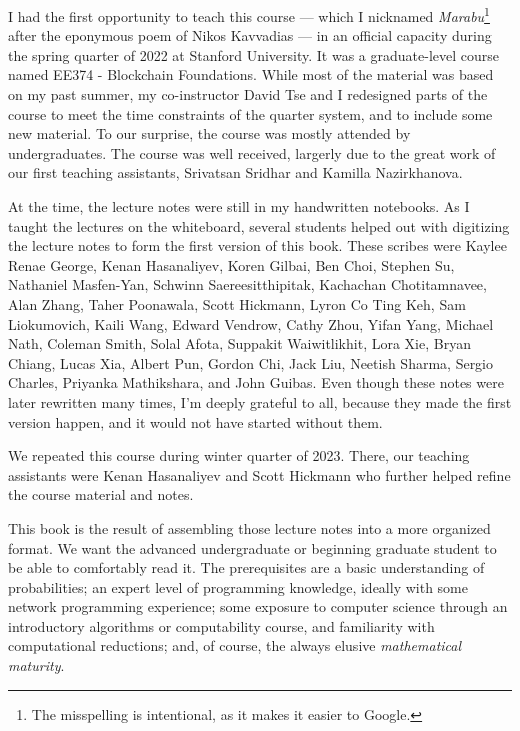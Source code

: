 % 
I had the first opportunity to teach this course --- which I nicknamed
\emph{Marabu}\footnote{The misspelling is intentional, as it makes it easier to Google.}
after the eponymous poem of Nikos Kavvadias --- in an official capacity during the
spring quarter of 2022 at Stanford University. It was a graduate-level course
named EE374 - Blockchain Foundations. While most of the material was
based on my past summer, my co-instructor David Tse and I redesigned
parts of the course to meet the time constraints of the quarter system,
and to include some new material. To our surprise, the course was mostly
attended by undergraduates.
The course was well received,
largerly due to the great work of our first teaching assistants,
Srivatsan Sridhar and Kamilla Nazirkhanova.

At the time, the lecture notes were still
in my handwritten notebooks. As I taught the lectures on the whiteboard,
several students helped out with digitizing the lecture notes to
form the first version of this book. These scribes were
Kaylee Renae George, Kenan Hasanaliyev, Koren Gilbai,
Ben Choi, Stephen Su, Nathaniel Masfen-Yan,
Schwinn Saereesitthipitak, Kachachan Chotitamnavee, Alan Zhang,
Taher Poonawala, Scott Hickmann,
Lyron Co Ting Keh, Sam Liokumovich,
Kaili Wang,
Edward Vendrow, Cathy Zhou,
Yifan Yang,
Michael Nath, Coleman Smith,
Solal Afota,
Suppakit Waiwitlikhit, Lora Xie,
Bryan Chiang, Lucas Xia,
Albert Pun, Gordon Chi,
Jack Liu,
Neetish Sharma, Sergio Charles,
Priyanka Mathikshara, and John Guibas.
Even though these notes were later rewritten many times,
I'm deeply grateful to all, because they made the first version happen,
and it would not have started without them.

We repeated this course during winter quarter of 2023.
There, our teaching assistants were Kenan Hasanaliyev
and Scott Hickmann who further helped refine the course material and notes.

This book is the result of assembling those lecture notes into a
more organized format. We want the advanced undergraduate or beginning
graduate student to be able to comfortably read it. The prerequisites
are a basic understanding of probabilities; an expert level of programming
knowledge, ideally with some network programming experience; some exposure
to computer science through an introductory algorithms or computability
course, and familiarity with computational reductions;
and, of course, the always elusive \emph{mathematical maturity}.

